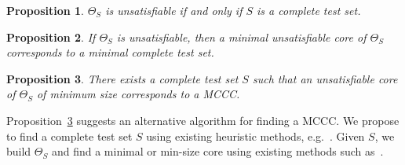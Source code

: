 \documentclass{article}
\newcommand{\MCCC}{\textsc{MCCC}\xspace}
\newtheorem{proposition}{Proposition}
\begin{document}
\begin{proposition}
$\Theta_S$ is unsatisfiable if and only if $S$ is a complete test set.
\end{proposition}


\begin{proposition}
If $\Theta_S$ is unsatisfiable, then a minimal unsatisfiable core of $\Theta_S$ corresponds to a minimal complete test set.
\end{proposition}

\begin{proposition}
\label{prop:minmus}
There exists a complete test set $S$ such that an unsatisfiable core of $\Theta_S$ of minimum size corresponds to a \MCCC.
\end{proposition}

Proposition~\ref{prop:minmus} suggests an alternative algorithm for finding a \MCCC. We propose to find a complete test set $S$ using existing heuristic methods, e.g.~\cite{czutro14}. Given $S$, we build $\Theta_S$ and find a minimal or min-size core using existing methods such as~\cite{belov12,ignatiev13}.         


\end{document}
